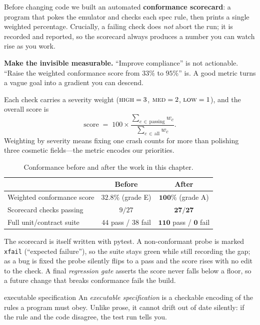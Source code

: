 \documentclass[11pt,a4paper]{article}
\newcommand{\code}[1]{\texttt{#1}}
\begin{document}
Before changing code we built an automated \textbf{conformance scorecard}: a
program that pokes the emulator and checks each spec rule, then prints a single
weighted percentage. Crucially, a failing check does \emph{not} abort the run;
it is recorded and reported, so the scorecard always produces a number you can
watch rise as you work.

\begin{keyidea}
\textbf{Make the invisible measurable.} ``Improve compliance'' is not
actionable. ``Raise the weighted conformance score from $33\%$ to $95\%$'' is.
A good metric turns a vague goal into a gradient you can descend.
\end{keyidea}

Each check carries a severity weight ($\textsc{high}=3$, $\textsc{med}=2$,
$\textsc{low}=1$), and the overall score is
\[
  \text{score} \;=\;
  100 \times
  \frac{\sum_{c\,\in\,\text{passing}} w_c}{\sum_{c\,\in\,\text{all}} w_c}.
\]
Weighting by severity means fixing one crash counts for more than polishing
three cosmetic fields---the metric encodes our priorities.

\begin{table}[h]
\centering
\caption{Conformance before and after the work in this chapter.}
\begin{tabular}{lcc}
\toprule
 & \textbf{Before} & \textbf{After}\\
\midrule
Weighted conformance score & $32.8\%$ (grade E) & $\mathbf{100\%}$ (grade A)\\
Scorecard checks passing    & $9/27$            & $\mathbf{27/27}$\\
Full unit/contract suite    & $44$ pass / $38$ fail & $\mathbf{110}$ pass / $\mathbf{0}$ fail\\
\bottomrule
\end{tabular}
\end{table}

The scorecard is itself written with \textsf{pytest}. A non-conformant probe is
marked \code{xfail} (``expected failure''), so the suite stays green while still
recording the gap; as a bug is fixed the probe silently flips to a pass and the
score rises with no edit to the check. A final \emph{regression gate} asserts
the score never falls below a floor, so a future change that breaks conformance
fails the build.

\begin{defbox}{executable specification}
An \emph{executable specification} is a checkable encoding of the rules a
program must obey. Unlike prose, it cannot drift out of date silently: if the
rule and the code disagree, the test run tells you.
\end{defbox}
\end{document}
